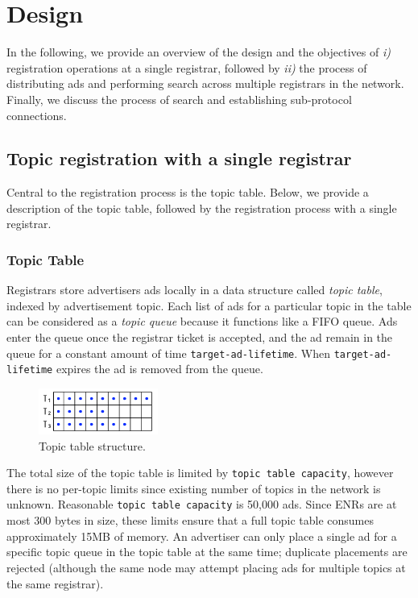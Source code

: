 
\section{Design}
\label{sec:design}

In the following, we provide an overview of the design and the objectives of \textit{i)} registration operations at a single registrar, followed by \textit{ii)} the process of distributing ads and performing search across multiple registrars in the network. Finally, we discuss the process of search and establishing sub-protocol connections. 

\subsection{Topic registration with a single registrar}\label{sec:registration_single}

Central to the registration process is the topic table. 
Below, we provide a description of the topic table, followed by the registration process with a single registrar. 

\subsubsection{Topic Table}

Registrars store advertisers ads locally in a data structure called \emph{topic table}, 
indexed by advertisement topic. 
Each list of ads for a particular topic in the table  can be considered as a \emph{topic queue} because it functions like a FIFO queue.
Ads enter the queue once the registrar ticket is accepted,  and
the ad remain in the queue for a constant amount of time \texttt{target-ad-lifetime}. 
When \texttt{target-ad-lifetime} expires the ad is removed  from the queue.

\begin{figure}
    \includegraphics[width=0.35\textwidth]{img/topic-queue-diagram.png}
    \caption{Topic table structure.}
    \label{fig:topic_table}
 \end{figure}

The total size of the topic table is limited by \texttt{topic table capacity},  however there is no per-topic limits since existing number of topics in the network is unknown. 
Reasonable \texttt{topic table capacity} is 50,000 ads. 
Since ENRs are at most 300 bytes in size, these limits ensure that a full topic table consumes approximately 15MB of memory.
An advertiser can only place a single ad for a specific topic queue in the topic table at the same time; duplicate placements are rejected (although the same node may attempt placing ads for multiple topics at the same registrar).

